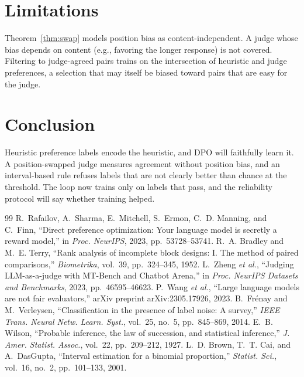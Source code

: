 \documentclass[conference]{IEEEtran}
\theoremstyle{remark}
\begin{document}
\section{Limitations}
Theorem~\ref{thm:swap} models position bias as content-independent. A judge whose bias depends on content (e.g., favoring the longer response) is not covered. Filtering to judge-agreed pairs trains on the intersection of heuristic and judge preferences, a selection that may itself be biased toward pairs that are easy for the judge.

\section{Conclusion}
Heuristic preference labels encode the heuristic, and DPO will faithfully learn it. A position-swapped judge measures agreement without position bias, and an interval-based rule refuses labels that are not clearly better than chance at the threshold. The loop now trains only on labels that pass, and the reliability protocol will say whether training helped.

\begin{thebibliography}{99}
 R.~Rafailov, A.~Sharma, E.~Mitchell, S.~Ermon, C.~D. Manning, and C.~Finn, ``Direct preference optimization: Your language model is secretly a reward model,'' in \emph{Proc. NeurIPS}, 2023, pp.~53728--53741.
 R.~A. Bradley and M.~E. Terry, ``Rank analysis of incomplete block designs: I. The method of paired comparisons,'' \emph{Biometrika}, vol.~39, pp.~324--345, 1952.
 L.~Zheng \emph{et al.}, ``Judging LLM-as-a-judge with MT-Bench and Chatbot Arena,'' in \emph{Proc. NeurIPS Datasets and Benchmarks}, 2023, pp.~46595--46623.
 P.~Wang \emph{et al.}, ``Large language models are not fair evaluators,'' arXiv preprint arXiv:2305.17926, 2023.
 B.~Fr{\'e}nay and M.~Verleysen, ``Classification in the presence of label noise: A survey,'' \emph{IEEE Trans. Neural Netw. Learn. Syst.}, vol.~25, no.~5, pp.~845--869, 2014.
 E.~B. Wilson, ``Probable inference, the law of succession, and statistical inference,'' \emph{J. Amer. Statist. Assoc.}, vol.~22, pp.~209--212, 1927.
 L.~D. Brown, T.~T. Cai, and A.~DasGupta, ``Interval estimation for a binomial proportion,'' \emph{Statist. Sci.}, vol.~16, no.~2, pp.~101--133, 2001.
\end{thebibliography}
\end{document}

